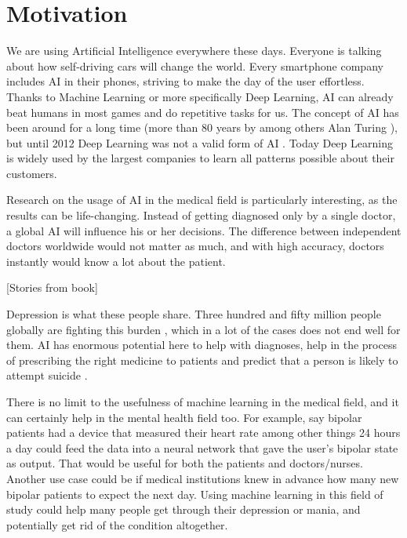 
\section{Motivation}

We are using Artificial Intelligence everywhere these days. Everyone is talking about how self-driving cars will change the world. Every smartphone company includes AI in their phones, striving to make the day of the user effortless. Thanks to Machine Learning or more specifically Deep Learning, AI can already beat humans in most games and do repetitive tasks for us. The concept of AI has been around for a long time (more than 80 years by among others Alan Turing \cite{turing1938}), but until 2012 Deep Learning was not a valid form of AI \cite{topol2019}. Today Deep Learning is widely used by the largest companies to learn all patterns possible about their customers. 

Research on the usage of AI in the medical field is particularly interesting, as the results can be life-changing. Instead of getting diagnosed only by a single doctor, a global AI will influence his or her decisions. The difference between independent doctors worldwide would not matter as much, and with high accuracy, doctors instantly would know a lot about the patient. 

[Stories from book]

Depression is what these people share. Three hundred and fifty million people globally are fighting this burden \cite{burden_of_depression}, which in a lot of the cases does not end well for them. AI has enormous potential here to help with diagnoses, help in the process of prescribing the right medicine to patients and predict that a person is likely to attempt suicide \cite{topol2019}. 

There is no limit to the usefulness of machine learning in the medical field, and it can certainly help in the mental health field too. For example, say bipolar patients had a device that measured their heart rate among other things 24 hours a day could feed the data into a neural network that gave the user's bipolar state as output. That would be useful for both the patients and doctors/nurses. Another use case could be if medical institutions knew in advance how many new bipolar patients to expect the next day. Using machine learning in this field of study could help many people get through their depression or mania, and potentially get rid of the condition altogether.

